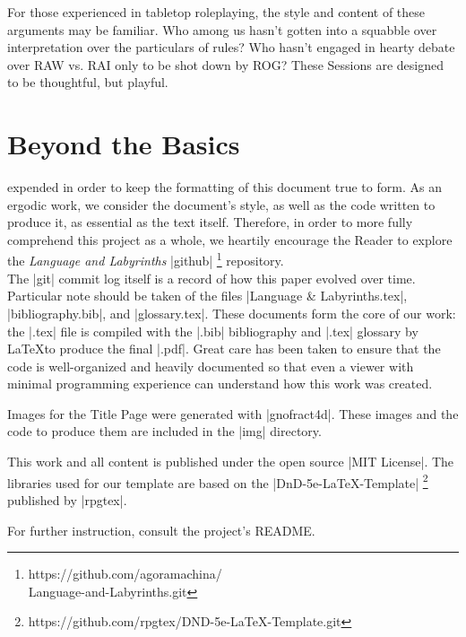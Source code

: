 \documentclass[10pt,twoside,twocolumn,openany,nomultitoc]{book}
\begin{document}
    For those experienced in tabletop roleplaying, the style and content of these arguments may be familiar. Who among us hasn't gotten into a squabble over interpretation over the particulars of rules? Who hasn't engaged in hearty debate over RAW vs. RAI only to be shot down by ROG? These Sessions are designed to be thoughtful, but playful. 

 \vspace{42pt} 
 \section{Beyond the Basics}\vspace{2pt}
    expended in order to keep the formatting of this document true to form. As an ergodic work, we consider the document's style, as well as the code written to produce it, as essential as the text itself. Therefore, in order to more fully comprehend this project as a whole, we heartily encourage the Reader to explore the \textit{Language and Labyrinths} |github| \footnote{https://github.com/agoramachina/\\\hspace{6pt}Language-and-Labyrinths.git} repository. \\

The |git| commit log itself is a record of how this paper evolved over time.  Particular note should be taken of the files |Language & Labyrinths.tex|, |bibliography.bib|, and |glossary.tex|. These documents form the core of our work: the |.tex| file is compiled with the |.bib| bibliography and |.tex| glossary by \LaTeX to produce the final |.pdf|. Great care has been taken to ensure that the code is well-organized and heavily documented so that even a viewer with minimal programming experience can understand how this work was created. \\\vspace{12pt}

Images for the Title Page were generated with |gnofract4d|. These images and the code to produce them are included in the |img| directory. 

This work and all content is published under the open source |MIT License|. The libraries used for our template are based on the |DnD-5e-LaTeX-Template| \footnote{https://github.com/rpgtex/DND-5e-LaTeX-Template.git} published by |rpgtex|.  

For further instruction, consult the project's README.      
    
\end{document}
